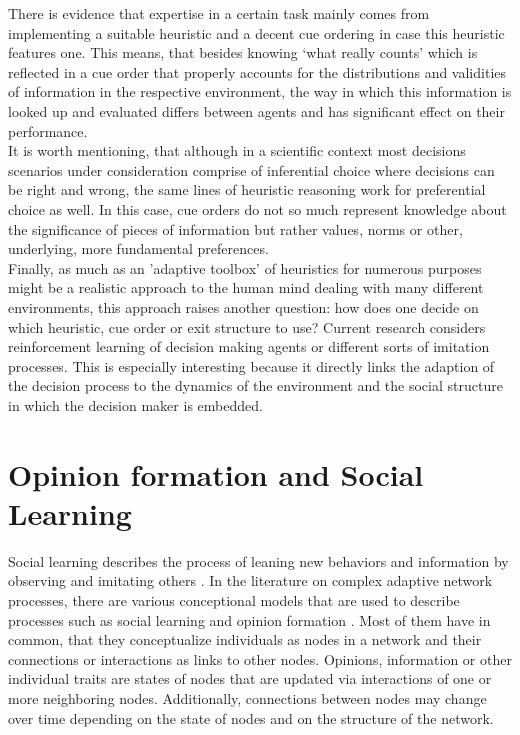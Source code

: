 There is evidence \cite{Garcia-Retamero2009,Pachur2013} that expertise in a certain task mainly comes from implementing a suitable heuristic and a decent cue ordering in case this heuristic features one. This means, that besides knowing `what really counts' which is reflected in a cue order that properly accounts for the distributions and validities of information in the respective environment, the way in which this information is looked up and evaluated differs between agents and has significant effect on their performance.\\
It is worth mentioning, that although in a scientific context most decisions scenarios under consideration comprise of inferential choice where decisions can be right and wrong, the same lines of heuristic reasoning work for preferential choice as well. In this case, cue orders do not so much represent knowledge about the significance of pieces of information but rather values, norms or other, underlying, more fundamental preferences.\\
Finally, as much as an 'adaptive toolbox' of heuristics for numerous purposes might be a realistic approach to the human mind dealing with many different environments, this approach raises another question: how does one decide on which heuristic, cue order or exit structure to use? Current research \cite{garcia2009does,Rieskamp2006} considers reinforcement learning of decision making agents or different sorts of imitation processes. This is especially interesting because it directly links the adaption of the decision process to the dynamics of the environment and the social structure in which the decision maker is embedded.\\

\section{Opinion formation and Social Learning}
Social learning describes the process of leaning new behaviors and information by observing and imitating others \citep{Bandura1971}. In the literature on complex adaptive network processes, there are various conceptional models that are used to describe processes such as social learning and opinion formation \citep[for an overview see e.g.]{castellano2009statistical}. Most of them have in common, that they conceptualize individuals as nodes in a network and their connections or interactions as links to other nodes. Opinions, information or other individual traits are states of nodes that are updated via interactions of one or more neighboring nodes. Additionally, connections between nodes may change over time depending on the state of nodes and on the structure of the network.

